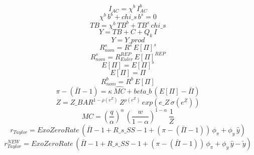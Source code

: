 \documentclass[10pt,a4paper]{article}
\begin{document}
\begin{dmath}
I_{AC}=\chi^b \, I_{AC}^b
\end{dmath}
\begin{dmath}
\chi^b \, b^b+chi\_s\, b^s=0
\end{dmath}
\begin{dmath}
TB=\chi^b \, TB^b+TB^s\, chi\_s
\end{dmath}
\begin{dmath}
Y=TB+C+ Q_k \, I
\end{dmath}
\begin{dmath}
Y=Y\_prod
\end{dmath}
\begin{dmath}
 R^s_{nom}=R^s\,  E[\Pi]^{s} 
\end{dmath}
\begin{dmath}
 R^s_{nom}= R^{REP}_{Euler} \,  E[\Pi]^{REP} 
\end{dmath}
\begin{dmath}
 E[\Pi] = E[\Pi]^{s} 
\end{dmath}
\begin{dmath}
 E[\Pi] = \Pi 
\end{dmath}
\begin{dmath}
 R^b_{nom}=R^b\,  E[\Pi] 
\end{dmath}
\begin{dmath}
 \pi -\left( \bar{\Pi} -1\right)=\kappa\,  \hat{MC} +beta\_b\, \left( E[\Pi] - \bar{\Pi} \right)
\end{dmath}
\begin{dmath}
Z=Z\_BAR^{1- \rho(e^Z) }\, Z^{ \rho(e^Z) }\, exp\left(e\_Z\,  \sigma(e^Z) \right)
\end{dmath}
\begin{dmath}
MC=\left(\frac{q}{\alpha }\right)^{\alpha }\, \left(\frac{w}{1-\alpha }\right)^{1-\alpha }\, \frac{1}{Z}
\end{dmath}
\begin{dmath}
 r_{Taylor} =ExoZeroRate\, \left( \bar{\Pi} -1+R\_s\_SS-1+\left( \pi -\left( \bar{\Pi} -1\right)\right)\, \phi_{\pi}+\phi_{y}\,  \hat{y} \right)
\end{dmath}
\begin{dmath}
 r_{Taylor}^{NEW} =ExoZeroRate\, \left( \bar{\Pi} -1+R\_s\_SS-1+\left( \pi -\left( \bar{\Pi} -1\right)\right)\, \phi_{\pi}+\phi_{y}\,  \hat{y} - \tilde{y} \right)
\end{dmath}
\end{document}
